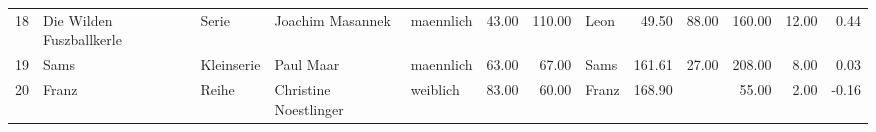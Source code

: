 \begin{sidewaystable}[ht]
\begin{center}
{\begin{tabular}{rllllrrlrrrrr}
  18 & Die Wilden Fuszballkerle                                                                                                                                                                                                                                        & Serie & Joachim Masannek                                                                                                                                                                                                                                                & maennlich & 43.00 & 110.00 & Leon                                                                                                                                                                                                                                                            & 49.50 & 88.00 & 160.00 & 12.00 & 0.44 \\ 
  19 & Sams                                                                                                                                                                                                                                                            & Kleinserie & Paul Maar                                                                                                                                                                                                                                                       & maennlich & 63.00 & 67.00 & Sams                                                                                                                                                                                                                                                            & 161.61 & 27.00 & 208.00 & 8.00 & 0.03 \\ 
  20 & Franz                                                                                                                                                                                                                                                           & Reihe & Christine Noestlinger                                                                                                                                                                                                                                           & weiblich & 83.00 & 60.00 & Franz                                                                                                                                                                                                                                                           & 168.90 &  & 55.00 & 2.00 & -0.16 \\ 

\end{tabular}}
\end{center}
\end{sidewaystable}

